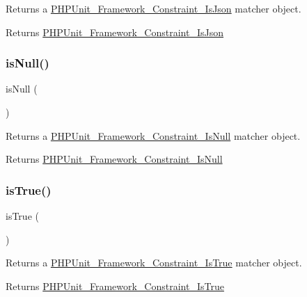 Returns a \mbox{\hyperlink{class_p_h_p_unit___framework___constraint___is_json}{P\+H\+P\+Unit\+\_\+\+Framework\+\_\+\+Constraint\+\_\+\+Is\+Json}} matcher object.

\begin{DoxyReturn}{Returns}
\mbox{\hyperlink{class_p_h_p_unit___framework___constraint___is_json}{P\+H\+P\+Unit\+\_\+\+Framework\+\_\+\+Constraint\+\_\+\+Is\+Json}} 
\end{DoxyReturn}
\mbox{\label{_functions_8php_a4af7cea238ab52f6e40a1eed86bdc1be}} 
\subsubsection{\texorpdfstring{is\+Null()}{isNull()}}
{\footnotesize\ttfamily is\+Null (\begin{DoxyParamCaption}{ }\end{DoxyParamCaption})}

Returns a \mbox{\hyperlink{class_p_h_p_unit___framework___constraint___is_null}{P\+H\+P\+Unit\+\_\+\+Framework\+\_\+\+Constraint\+\_\+\+Is\+Null}} matcher object.

\begin{DoxyReturn}{Returns}
\mbox{\hyperlink{class_p_h_p_unit___framework___constraint___is_null}{P\+H\+P\+Unit\+\_\+\+Framework\+\_\+\+Constraint\+\_\+\+Is\+Null}} 
\end{DoxyReturn}
\mbox{\label{_functions_8php_a3c9249e55831fca5b37d7afc0df9216c}} 
\subsubsection{\texorpdfstring{is\+True()}{isTrue()}}
{\footnotesize\ttfamily is\+True (\begin{DoxyParamCaption}{ }\end{DoxyParamCaption})}

Returns a \mbox{\hyperlink{class_p_h_p_unit___framework___constraint___is_true}{P\+H\+P\+Unit\+\_\+\+Framework\+\_\+\+Constraint\+\_\+\+Is\+True}} matcher object.

\begin{DoxyReturn}{Returns}
\mbox{\hyperlink{class_p_h_p_unit___framework___constraint___is_true}{P\+H\+P\+Unit\+\_\+\+Framework\+\_\+\+Constraint\+\_\+\+Is\+True}} 
\end{DoxyReturn}
\mbox{\label{_functions_8php_a72810c431795eef57c10cec4a620807a}} 
